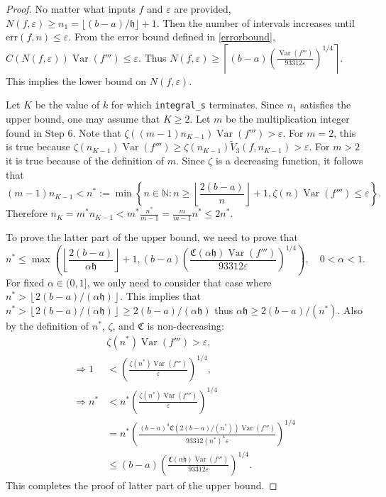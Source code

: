 \documentclass{iitthesis}
\DeclareMathOperator{\Var}{Var}
\theoremstyle{definition}
\theoremstyle{remark}
\begin{document}
\begin{proof}
  No matter what inputs $f$ and $\varepsilon$ are provided, $N(f,\varepsilon)\ge n_1=\lfloor (b-a)/\mathfrak{h}\rfloor+1$. Then the number of intervals increases until $\overline{\text{err}}(f,n)\le\varepsilon$. From the error bound defined in \eqref{errorbound}, $C(N(f,\varepsilon))\Var(f''')\leq \varepsilon$. Thus $N(f,\varepsilon)\geq \left\lceil(b-a)\left(\frac{\Var(f''')}{93312\varepsilon}\right)^{1/4}\right\rceil$. This implies the lower bound on $N(f,\varepsilon)$.

  Let $K$ be the value of $k$ for which {\tt integral\_s} terminates. Since $n_1$ satisfies the upper bound, one may assume that $K \ge 2$. Let $m$ be the multiplication integer found in Step 6. Note that $\zeta((m-1)n_{K-1})\Var(f''')>\varepsilon$. For $m=2$, this is true because $\zeta(n_{K-1})\Var(f''')\ge\zeta(n_{K-1})\widetilde{V}_{3}(f,n_{K-1})>\varepsilon$. For $m>2$ it is true because of the definition of $m$. Since $\zeta$ is a decreasing function, it follows that
  $$(m-1)n_{K-1}<n^*:=\min\left\{n\in\mathbb{N}:n\ge\left\lfloor\frac{2(b-a)}{n}\right\rfloor+1,\zeta(n)\Var(f''')\le\varepsilon\right\}.$$
  Therefore $n_K=m^*n_{K-1}<m^*\frac{n^*}{m-1}=\frac{m}{m-1}n^*\le2n^*$.

  To prove the latter part of the upper bound, we need to prove that
  $$n^*\leq\max\left(\left\lfloor\frac{2(b-a)}{\alpha\mathfrak{h}}\right\rfloor+1,(b-a)\left(\frac{\mathfrak{C}(\alpha\mathfrak{h})\Var(f''')}{93312\varepsilon}\right)^{1/4}\right),\quad 0<\alpha<1.$$
  For fixed $\alpha\in(0,1]$, we only need to consider that case where $n^*>\left\lfloor2(b-a)/(\alpha\mathfrak{h})\right\rfloor$. This implies that $n^*>\left\lfloor2(b-a)/(\alpha\mathfrak{h})\right\rfloor\ge 2(b-a)/(\alpha\mathfrak{h})$ thus $\alpha\mathfrak{h}\ge2(b-a)/(n^*)$. Also by the definition of $n^*$, $\zeta$, and $\mathfrak{C}$ is non-decreasing:
  \begin{align*}
    &\zeta(n^*)\Var(f''')>\varepsilon, \\
    \Rightarrow 1&<\left(\frac{\zeta(n^*)\Var(f''')}{\varepsilon}\right)^{1/4},\\
    \Rightarrow n^*&<n^*\left(\frac{\zeta(n^*)\Var(f''')}{\varepsilon}\right)^{1/4}\\
    &=n^*\left(\frac{(b-a)^4\mathfrak{C}(2(b-a)/(n^*))\Var(f''')}{93312(n^*)^4\varepsilon}\right)^{1/4}\\
    &\le(b-a)\left(\frac{\mathfrak{C}(\alpha\mathfrak{h})\Var(f''')}{93312\varepsilon}\right)^{1/4}.
  \end{align*}
  This completes the proof of latter part of the upper bound.
\end{proof}
\end{document}
